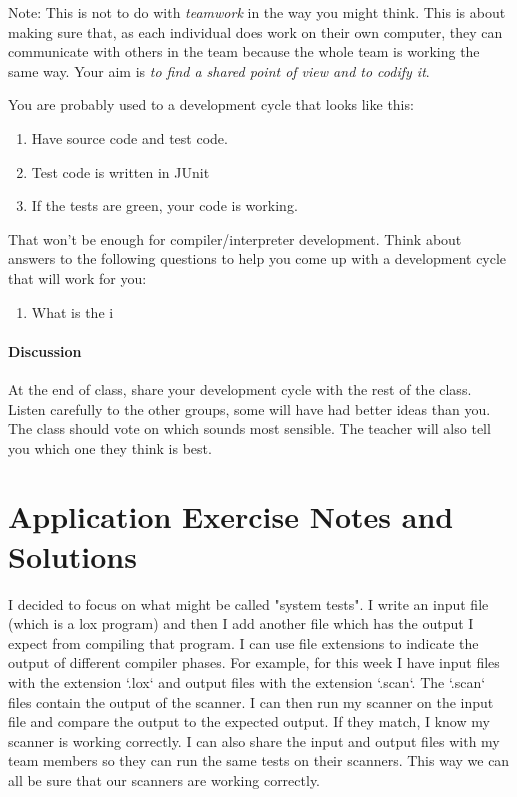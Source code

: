 \documentclass[twoside=false, DIV=14]{scrartcl}
\begin{document}
Note: This is not to do with \emph{teamwork} in the way you might think.  This is about making sure that, as each individual does work on their own computer, they can communicate with others in the team because the whole team is working the same way.  Your aim is \emph{to find a shared point of view and to codify it}.

You are probably used to a development cycle that looks like this:
\begin{enumerate}
  \item Have source code and test code.
  \item Test code is written in JUnit
  \item If the tests are green, your code is working.
\end{enumerate}
That won't be enough for compiler/interpreter development.  Think about answers to the following questions to help you come up with a development cycle that will work for you:
\begin{enumerate}
  \item What is the i
\end{enumerate}
\subsection*{Discussion}
At the end of class, share your development cycle with the rest of the class.  Listen carefully to the other groups, some will have had better ideas than you.  The class should vote on which sounds most sensible.  The teacher will also tell you which one they think is best.  

\newpage
\part*{Application Exercise Notes and Solutions}
I decided to focus on what might be called "system tests".  I write an input file (which is a lox program) and then I add another file which has the output I expect from compiling that program.  I can use file extensions to indicate the output of different compiler phases.  For example, for this week I have input files with the extension `.lox` and output files with the extension `.scan`.  The `.scan` files contain the output of the scanner.  I can then run my scanner on the input file and compare the output to the expected output.  If they match, I know my scanner is working correctly.  I can also share the input and output files with my team members so they can run the same tests on their scanners.  This way we can all be sure that our scanners are working correctly.
\newpage
\end{document}

